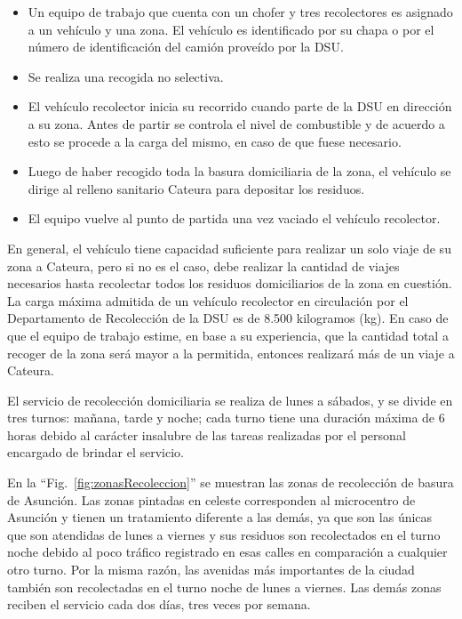 \documentclass[conference]{IEEEtran}
\begin{document}
\begin{itemize}
\item Un equipo de trabajo que cuenta con un chofer y tres recolectores es asignado a un vehículo y una zona. El vehículo es identificado por su chapa o por el número de identificación del camión proveído por la DSU.
\item Se realiza una recogida no selectiva.
\item El vehículo recolector inicia su recorrido cuando parte de la DSU en dirección a su zona. Antes de partir se controla el nivel de combustible y de acuerdo a esto se procede a la carga del mismo, en caso de que fuese necesario.
\item Luego de haber recogido toda la basura domiciliaria de la zona, el vehículo se dirige al relleno sanitario Cateura para depositar los residuos.
\item El equipo vuelve al punto de partida una vez vaciado el vehículo recolector.  
\end{itemize}

En general, el vehículo tiene capacidad suficiente para realizar un solo viaje de su zona a Cateura, pero si no es el caso, debe realizar la cantidad de viajes necesarios hasta recolectar todos los residuos domiciliarios de la zona en cuestión. La carga máxima admitida de un vehículo recolector en circulación por el Departamento de Recolección de la DSU es de 8.500 kilogramos (kg). En caso de que el equipo de trabajo estime, en base a su experiencia, que la cantidad total a recoger de la zona será mayor a la permitida, entonces realizará más de un viaje a Cateura.

El servicio de recolección domiciliaria se realiza de lunes a sábados, y se divide en tres turnos: mañana, tarde y noche; cada turno tiene una duración máxima de 6 horas debido al carácter insalubre de las tareas realizadas por el personal encargado de brindar el servicio.

En la ``Fig.~\ref{fig:zonasRecoleccion}'' se muestran las zonas de recolección de basura de Asunción. Las zonas pintadas en celeste corresponden al microcentro de Asunción y tienen un tratamiento diferente a las demás, ya que son las únicas que son atendidas de lunes a viernes y sus residuos son recolectados en el turno noche debido al poco tráfico registrado en esas calles en comparación a cualquier otro turno. Por la misma razón, las avenidas más importantes de la ciudad también son recolectadas en el turno noche de lunes a viernes. Las demás zonas reciben el servicio cada dos días, tres veces por semana.
\end{document}
